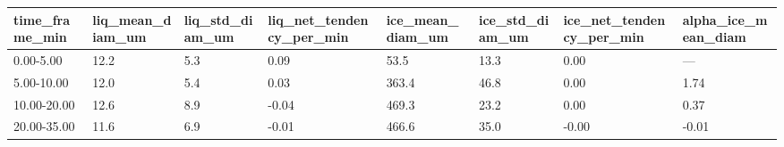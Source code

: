 \begin{tabular}{llllllll}
\toprule
time_frame_min & liq_mean_diam_um & liq_std_diam_um & liq_net_tendency_per_min & ice_mean_diam_um & ice_std_diam_um & ice_net_tendency_per_min & alpha_ice_mean_diam \\
\midrule
0.00-5.00 & 12.2 & 5.3 & 0.09 & 53.5 & 13.3 & 0.00 & — \\
5.00-10.00 & 12.0 & 5.4 & 0.03 & 363.4 & 46.8 & 0.00 & 1.74 \\
10.00-20.00 & 12.6 & 8.9 & -0.04 & 469.3 & 23.2 & 0.00 & 0.37 \\
20.00-35.00 & 11.6 & 6.9 & -0.01 & 466.6 & 35.0 & -0.00 & -0.01 \\
\bottomrule
\end{tabular}
